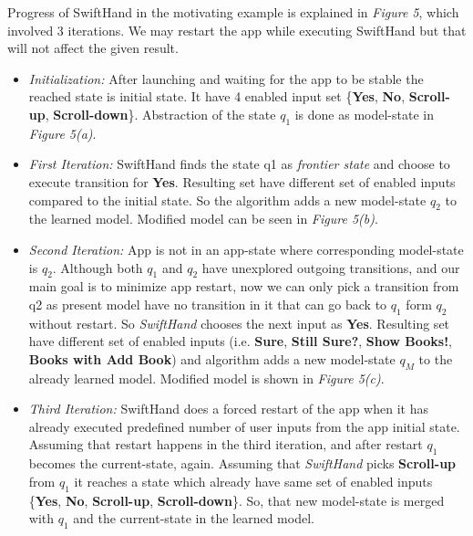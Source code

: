 \documentclass[authoryear,preprint, twocolumn]{sigplanconf}
\begin{document}
\newline Progress of SwiftHand in the motivating example is explained in \emph{Figure 5}, which involved 3 iterations. We may restart the app while executing SwiftHand but that will not affect the given result.
\begin{itemize}
	\item \emph{Initialization:} After launching and waiting for the app to be stable the reached state is initial state. It have 4 enabled input set \{\textbf{Yes}, \textbf{No}, \textbf{Scroll-up}, \textbf{Scroll-down}\}. Abstraction of the state $q_1$ is done as model-state in \emph{Figure 5(a)}.

	\item \emph{First Iteration:} SwiftHand finds the state q1 as \emph{frontier state} and choose to execute transition for \textbf{Yes}. Resulting set have different set of enabled inputs compared to the initial state. So the algorithm adds a new model-state $q_2$ to the learned model. Modified model can be seen in \emph{Figure 5(b)}.

	\item \emph{Second Iteration:} App is not in an app-state where corresponding model-state is $q_2$. Although both $q_1$ and $q_2$ have unexplored outgoing transitions, and our main goal is to minimize app restart, now we can only pick a transition from q2 as present model have no transition in it that can go back to $q_1$ form $q_2$ without restart. So \emph{SwiftHand} chooses the next input as \textbf{Yes}. Resulting set have different set of enabled inputs (i.e. \textbf{Sure}, \textbf{Still Sure?}, \textbf{Show Books!}, \textbf{Books with Add Book}) and algorithm adds a new model-state $q_M$ to the already learned model. Modified model is shown in \emph{Figure 5(c)}.

	\item \emph{Third Iteration:} SwiftHand does a forced restart of the app when it has already executed predefined number of user inputs from the app initial state. Assuming that restart happens in the third iteration, and after restart $q_1$ becomes the current-state, again. Assuming that \emph{SwiftHand} picks \textbf{Scroll-up} from $q_1$ it reaches a state which already have same set of enabled inputs \{\textbf{Yes}, \textbf{No}, \textbf{Scroll-up}, \textbf{Scroll-down}\}. So, that new model-state is merged with $q_1$ and the current-state in the learned model.
\end{itemize}
\end{document}
